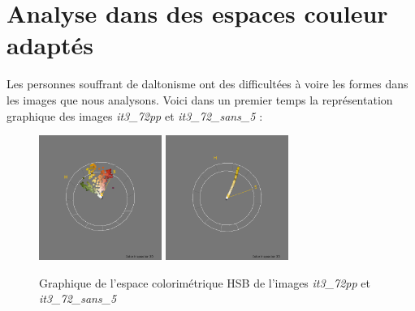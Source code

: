 \documentclass[a4paper,10pt]{article}
\begin{document}
\section{Analyse dans des espaces couleur adaptés}
Les personnes souffrant de daltonisme ont des difficultées à voire les formes dans les images que nous analysons. 
Voici dans un premier temps la représentation graphique des images \textit{it3\_72pp} et \textit{it3\_72\_sans\_5} :
\begin{figure}[!h]
 \begin{center}
 \includegraphics[width=4cm]{resultat/compare1_1.png}
 \includegraphics[width=4cm]{resultat/compare1_2.png}
 \caption{Graphique de l'espace colorimétrique HSB de l'images \textit{it3\_72pp} et \textit{it3\_72\_sans\_5}}
 \end{center}
\end{figure}
\end{document}

